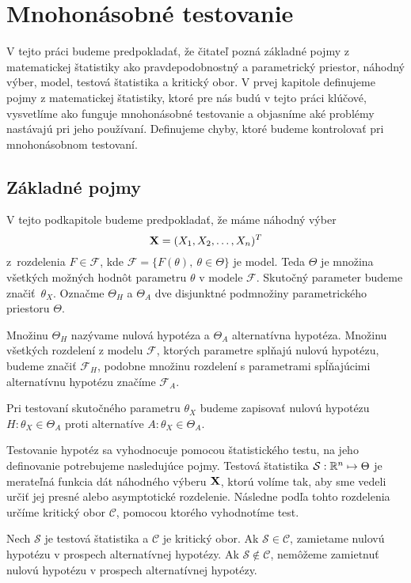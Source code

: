 \chapter{Mnohonásobné testovanie}

V tejto práci budeme predpokladať, že čitateľ pozná základné pojmy z matematickej štatistiky ako pravdepodobnostný a parametrický priestor, náhodný výber, 
model, testová štatistika a kritický obor.
V prvej kapitole definujeme pojmy z matematickej štatistiky, ktoré pre nás budú v tejto práci klúčové, 
vysvetlíme ako funguje mnohonásobné testovanie a objasníme aké problémy nastávajú pri jeho používaní. 
Definujeme chyby, ktoré budeme kontrolovať pri mnohonásobnom testovaní. 

\section{Základné pojmy}

V tejto podkapitole budeme predpokladať, že máme náhodný výber $${\bf X} = (X_1, X_2, \dots, X_n)^T$$ 
z~rozdelenia $F \in \mathcal{F}$, kde $\mathcal{F} = \{F(\theta), ~ \theta \in \Theta\}$ je model. 
Teda $\Theta$ je množina všetkých možných hodnôt parametru $\theta$ v modele $\mathcal{F}$. 
Skutočný parameter budeme značiť~$\theta_X$. 
Označme $\Theta_H$ a $\Theta_A$ dve disjunktné podmnožiny parametrického priestoru $\Theta$. 

\begin{definicia}\label{def1}
  Množinu $\Theta_H$ nazývame nulová hypotéza a $\Theta_A$ alternatívna hypotéza. 
  Množinu všetkých rozdelení z modelu $\mathcal{F}$, ktorých parametre splňajú nulovú hypotézu, budeme značiť $\mathcal{F}_H$, 
  podobne množinu rozdelení s parametrami spĺňajúcimi alternatívnu hypotézu značíme $\mathcal{F}_A$. 
\end{definicia}  

Pri testovaní skutočného parametru $\theta_X$ budeme zapisovať nulovú hypotézu $H: \theta_X \in \Theta_A$ 
proti alternatíve $A: \theta_X \in \Theta_A$. 

Testovanie hypotéz sa vyhodnocuje pomocou štatistického testu, 
na jeho definovanie potrebujeme nasledujúce pojmy. 
Testová štatistika $\mathcal{S} : \mathbb{R}^n \mapsto \Theta$ je merateľná funkcia dát náhodného výberu ${\bf X}$, 
ktorú volíme tak, aby sme vedeli určiť jej presné alebo asymptotické rozdelenie. 
Následne podľa tohto rozdelenia určíme kritický obor $\mathcal{C}$, 
pomocou ktorého vyhodnotíme test. 

Nech $\mathcal{S}$ je testová štatistika a $\mathcal{C}$ je kritický obor.  
Ak $\mathcal{S} \in \mathcal{C}$, zamietame nulovú hypotézu v prospech alternatívnej hypotézy.  
Ak $\mathcal{S} \notin \mathcal{C}$, nemôžeme zamietnuť nulovú hypotézu v prospech alternatívnej hypotézy. 

